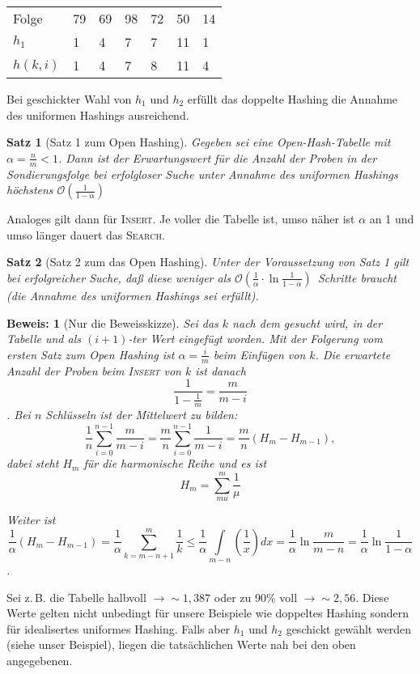 \documentclass[ngerman,draft,parskip=half*,twoside]{scrreprt}
\theoremstyle{break}
\newtheorem{satz}{Satz}[chapter]
\theoremstyle{nonumberbreak}
\newtheorem{beweis}{Beweis:}
\newcommand*{\OO}{\mathcal{O}}      %
\begin{document}
\begin{tabular}{lllllll}
Folge & 79 & 69 & 98 & 72 & 50 & 14\\
$h_1$ & 1 & 4 & 7 & 7 & 11 & 1\\
$h(k,i)$ & 1 & 4 & 7 & 8 & 11 & 4\\
\end{tabular}

Bei geschickter Wahl von $h_1$ und $h_2$ erfüllt das doppelte Hashing die Annahme des uniformen Hashings ausreichend.
 
\begin{satz}[Satz 1 zum Open Hashing]
Gegeben sei eine Open-Hash-Tabelle mit $\alpha=\frac{n}{m}<1$. Dann ist der Erwartungswert für die Anzahl der Proben in
der Sondierungsfolge bei erfolgloser Suche unter Annahme des uniformen Hashings höchstens
$\OO(\frac{1}{1-\alpha})$
\end{satz}
Analoges gilt dann für \textsc{Insert}. Je voller die Tabelle ist, umso näher ist $\alpha$ an 1 und umso länger
dauert das \textsc{Search}.

\begin{satz}[Satz 2 zum das Open Hashing]
Unter der Voraussetzung von Satz 1 gilt bei erfolgreicher Suche, daß
diese weniger als $\OO(\frac{1}{\alpha} \cdot\ln\frac{1}{1-\alpha})$~Schritte braucht (die Annahme des uniformen Hashings sei erfüllt).
\end{satz}

\begin{beweis}[Nur die Beweisskizze]
Sei das $k$ nach dem gesucht wird, in der Tabelle und als $(i+1)$-ter Wert eingefügt worden. Mit der Folgerung vom
ersten Satz zum Open Hashing ist $\alpha=\frac{i}{m}$ beim Einfügen von $k$. Die erwartete Anzahl der Proben beim
\textsc{Insert} von $k$ ist danach \[\frac{1}{1-\frac{1}{m}}=\frac{m}{m-i}\]
. Bei $n$ Schlüsseln ist der Mittelwert zu bilden: 
\[\frac{1}{n} \sum_{i=0}^{n-1} \frac{m}{m-i}=\frac{m}{n} \sum_{i=0}^{n-1}
\frac{1}{m-i}=\frac{m}{n}\left(H_m-H_{m-1}\right),\] dabei steht $H_m$ für die harmonische Reihe und es ist
\[H_m=\sum_{mu}^{m}\frac{1}{\mu}\]

Weiter ist
\[\frac{1}{\alpha}\left(H_m-H_{m-1}\right)=\frac{1}{\alpha} \sum_{k=m-n+1}^m \frac{1}{k} \leq \frac{1}{\alpha}\int
\limits_{m-n}
\left(\frac{1}{x}\right)dx=\frac{1}{\alpha} \ln{\frac{m}{m-n}}=\frac{1}{\alpha}\ln{\frac{1}{1-\alpha}}\].
\end{beweis}

Sei z.\,B. die Tabelle halbvoll $\rightarrow \sim 1,387$ oder zu 90\% voll $\rightarrow \sim 2,56$. Diese Werte gelten
nicht unbedingt für unsere Beispiele wie doppeltes Hashing sondern für idealisertes uniformes Hashing. Falls aber
$h_1$ und $h_2$ geschickt gewählt werden (siehe unser Beispiel), liegen die tatsächlichen Werte nah bei den oben
angegebenen. 
\end{document}
